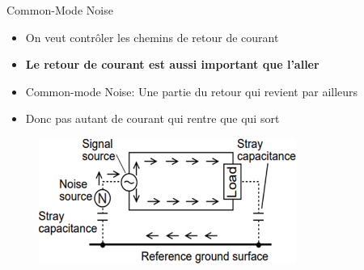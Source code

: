 \begin{frame}{Common-Mode Noise}
    \begin{itemize}
        \item On veut contrôler les chemins de retour de courant
        \item \textbf{Le retour de courant est aussi important que l'aller}
        \bigskip
        \item Common-mode Noise: Une partie du retour qui revient par ailleurs
        \item Donc pas autant de courant qui rentre que qui sort
    \end{itemize}
    \vfill
    \begin{figure}
        \includegraphics[width=0.75\textwidth, height=0.75\textheight, keepaspectratio]{pictures/common-mode-noise.png}
    \end{figure}
\end{frame}

